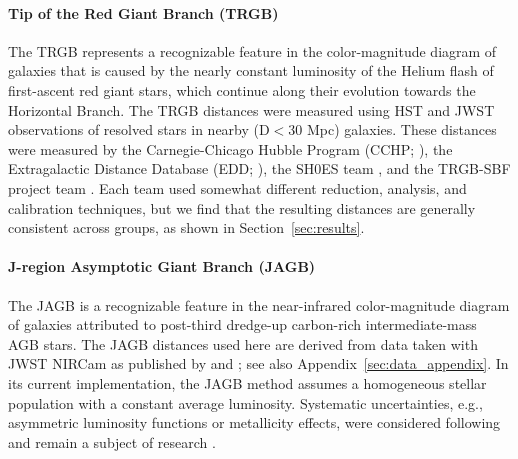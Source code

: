 \paragraph{\textbf{Tip of the Red Giant Branch (TRGB)}}
The TRGB represents a recognizable feature in the color-magnitude diagram of galaxies that is caused by the nearly constant luminosity of the Helium flash of first-ascent red giant stars, which continue along their evolution towards the Horizontal Branch.
The TRGB distances were measured using HST and JWST observations of resolved stars in nearby (D$<$30 Mpc) galaxies. These distances were measured by the Carnegie-Chicago Hubble Program (CCHP; \citealt{2019ApJ...882...34F, 2021ApJ...915...34H, 2025arXiv250311769H}), the Extragalactic Distance Database (EDD; \citealt{2009AJ....138..323T, 2021AJ....162...80A}), the SH0ES team \citep{2024ApJ...966...89A,2024ApJ...976..177L}, and the TRGB-SBF project team \citep{2024ApJ...973...83A, 2025ApJ...982...26A}. Each team used somewhat different reduction, analysis, and calibration techniques, but we find that the resulting distances are generally consistent across groups, as shown in Section~\ref{sec:results}.

\paragraph{J-region Asymptotic Giant Branch (JAGB)} The JAGB is a recognizable feature in the near-infrared color-magnitude diagram of galaxies attributed to post-third dredge-up carbon-rich intermediate-mass AGB stars. The JAGB distances used here are derived from data taken with {JWST} NIRCam as published by \citep[][SH0ES]{2024ApJ...966...20L,2025arXiv250205259L} and \citep[][CCHP]{2025ApJ...985..203F}; see also Appendix~\ref{sec:data_appendix}. In its current implementation, the JAGB method assumes a homogeneous stellar population with a constant average luminosity. Systematic uncertainties, e.g., asymmetric luminosity functions or metallicity effects, were considered following  \citet{2024ApJ...966...20L} and remain a subject of research \citep[e.g.,][]{2021ApJ...916...19Z,2024AA...691A.350M,2025ApJ...985..182L}.

